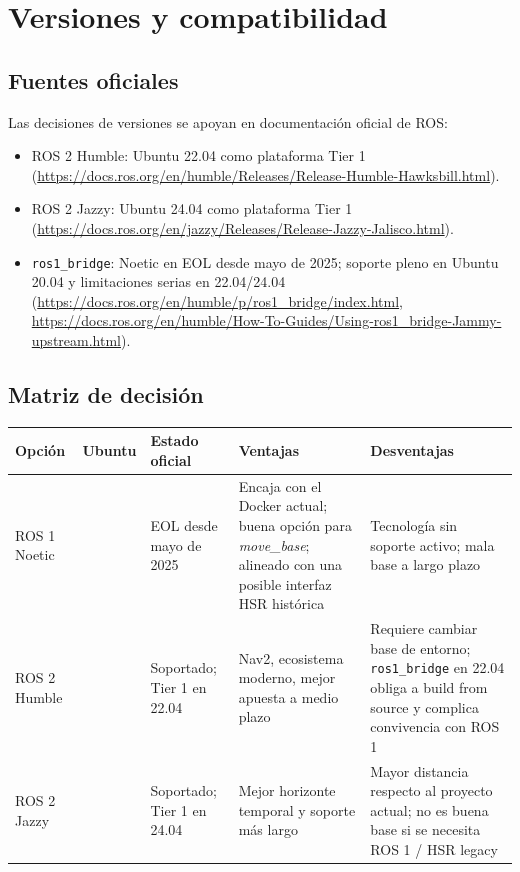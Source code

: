 \documentclass[11pt,a4paper]{article}
\begin{document}
\section{Versiones y compatibilidad}

\subsection{Fuentes oficiales}

Las decisiones de versiones se apoyan en documentación oficial de ROS:

\begin{itemize}
  \item ROS 2 Humble: Ubuntu 22.04 como plataforma Tier 1
        (\url{https://docs.ros.org/en/humble/Releases/Release-Humble-Hawksbill.html}).
  \item ROS 2 Jazzy: Ubuntu 24.04 como plataforma Tier 1
        (\url{https://docs.ros.org/en/jazzy/Releases/Release-Jazzy-Jalisco.html}).
  \item \texttt{ros1\_bridge}: Noetic en EOL desde mayo de 2025; soporte pleno
        en Ubuntu 20.04 y limitaciones serias en 22.04/24.04
        (\url{https://docs.ros.org/en/humble/p/ros1_bridge/index.html},
        \url{https://docs.ros.org/en/humble/How-To-Guides/Using-ros1_bridge-Jammy-upstream.html}).
\end{itemize}

\subsection{Matriz de decisión}

\begin{center}
\begin{tabular}{>{\raggedright\arraybackslash}p{3cm} >{\raggedright\arraybackslash}p{2.4cm} >{\raggedright\arraybackslash}p{3.2cm} >{\raggedright\arraybackslash}p{4.3cm} >{\raggedright\arraybackslash}p{3.2cm}}
\toprule
\textbf{Opción} & \textbf{Ubuntu} & \textbf{Estado oficial} & \textbf{Ventajas} & \textbf{Desventajas} \\
\midrule
ROS 1 Noetic & 20.04 & EOL desde mayo de 2025 & Encaja con el Docker actual; buena opción para \textit{move\_base}; alineado con una posible interfaz HSR histórica & Tecnología sin soporte activo; mala base a largo plazo \\
\addlinespace
ROS 2 Humble & 22.04 & Soportado; Tier 1 en 22.04 & Nav2, ecosistema moderno, mejor apuesta a medio plazo & Requiere cambiar base de entorno; \texttt{ros1\_bridge} en 22.04 obliga a build from source y complica convivencia con ROS 1 \\
\addlinespace
ROS 2 Jazzy & 24.04 & Soportado; Tier 1 en 24.04 & Mejor horizonte temporal y soporte más largo & Mayor distancia respecto al proyecto actual; no es buena base si se necesita ROS 1 / HSR legacy \\
\bottomrule
\end{tabular}
\end{center}
\end{document}
